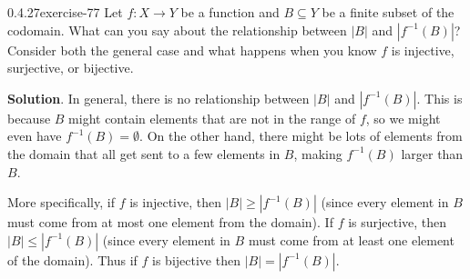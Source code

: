 \documentclass[twoside,11pt,]{book}
\numberwithin{equation}{chapter}
\newcommand{\inv}{^{-1}}
\newcommand{\card}[1]{\left| #1 \right|}
\begin{document}
\begin{divisionsolution}{0.4.27}{}{exercise-77}%
\hypertarget{p-1157}{}%
Let \(f:X \to Y\) be a function and \(B \subseteq Y\) be a finite subset of the codomain. What can you say about the relationship between \(\card{B}\) and \(\card{f\inv(B)}\)? Consider both the general case and what happens when you know \(f\) is injective, surjective, or bijective.%
\par\smallskip%
\noindent\textbf{Solution}.\quad%
\hypertarget{p-1158}{}%
In general, there is no relationship between \(\card{B}\) and \(\card{f\inv(B)}\). This is because \(B\) might contain elements that are not in the range of \(f\), so we might even have \(f\inv(B) = \emptyset\). On the other hand, there might be lots of elements from the domain that all get sent to a few elements in \(B\), making \(f\inv(B)\) larger than \(B\).%
\par
\hypertarget{p-1159}{}%
More specifically, if \(f\) is injective, then \(\card{B} \ge \card{f\inv(B)}\) (since every element in \(B\) must come from at most one element from the domain). If \(f\) is surjective, then \(\card{B} \le \card{f\inv(B)}\) (since every element in \(B\) must come from at least one element of the domain). Thus if \(f\) is bijective then \(\card{B} = \card{f\inv(B)}\).%
\end{divisionsolution}%
\end{document}

